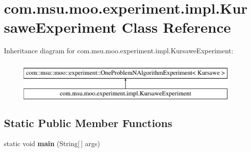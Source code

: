 \hypertarget{classcom_1_1msu_1_1moo_1_1experiment_1_1impl_1_1KursaweExperiment}{\section{com.\-msu.\-moo.\-experiment.\-impl.\-Kursawe\-Experiment Class Reference}
\label{classcom_1_1msu_1_1moo_1_1experiment_1_1impl_1_1KursaweExperiment}
}
Inheritance diagram for com.\-msu.\-moo.\-experiment.\-impl.\-Kursawe\-Experiment\-:\begin{figure}[H]
\begin{center}
\leavevmode
\includegraphics[height=2.000000cm]{classcom_1_1msu_1_1moo_1_1experiment_1_1impl_1_1KursaweExperiment}
\end{center}
\end{figure}
\subsection*{Static Public Member Functions}
\begin{DoxyCompactItemize}
\item 
\hypertarget{classcom_1_1msu_1_1moo_1_1experiment_1_1impl_1_1KursaweExperiment_a744c1633e78105230b74215066628c7b}{static void {\bfseries main} (String\mbox{[}$\,$\mbox{]} args)}\label{classcom_1_1msu_1_1moo_1_1experiment_1_1impl_1_1KursaweExperiment_a744c1633e78105230b74215066628c7b}

\end{DoxyCompactItemize}
